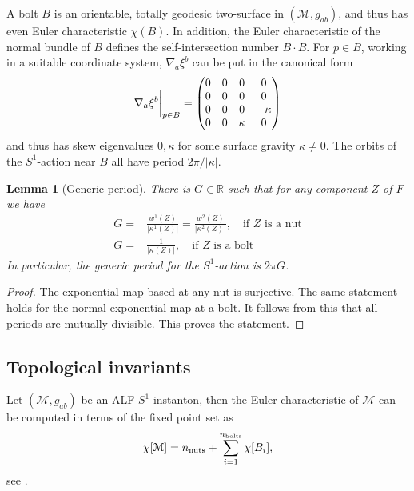 \documentclass[a4paper,10pt,reqno]{amsart}
\newcommand{\Reals}{\mathbb{R}}
\newcommand{\bolt}{B}
\newcommand{\cM}{\mathcal{M}}
\theoremstyle{plain}
\newtheorem{lemma}[thm]{Lemma}
\newcommand{\nnuts}{n_{\text{\rm nuts}}}
\newcommand{\nbolts}{n_{\text{\rm bolts}}}
\numberwithin{equation}{section}
\newcommand{\Fixed}{F}
\begin{document}
A bolt $\bolt$ is an orientable, totally geodesic 
two-surface in $(\cM, g_{ab})$,  and thus has even Euler characteristic $\chi(\bolt)$. In addition, the Euler characteristic of the normal bundle of $\bolt$ defines the self-intersection number $\bolt\!\cdot\! \bolt$.  For $p \in \bolt$, working in a suitable coordinate system, $\nabla_a \xi^b$ can be put in the canonical  form 
\begin{align} \label{eq:nablaxi(bolt)}
\nabla_a \xi^b \bigg{|}_{p \in \bolt} = \begin{pmatrix}0&0&0&0\\0 &0&0&0\\0&0&0&-\kappa\\0&0&\kappa&0\end{pmatrix}
\end{align} 
and thus has skew eigenvalues $0, \kappa$ for some surface gravity $\kappa \ne 0$. The orbits of the $S^1$-action near $\bolt$ all have period $2\pi/|\kappa|$. 


\begin{lemma}[Generic period] \label{lem:generic} 
%
%
There is $G \in \Reals$ such that for any component $Z$ of $\Fixed$ we have    
\begin{align} 
G ={}& \frac{w^1(Z)}{|\kappa^1(Z)|} = \frac{w^2(Z)}{|\kappa^2(Z)|}, \quad \text{if $Z$ is a nut} \\
G ={}& \frac{1}{|\kappa(Z)|}, \quad \text{if $Z$ is a bolt}
\end{align} 
%
In particular, the generic period for the $S^1$-action is $2\pi G$. 
\end{lemma} 
\begin{proof} 
The exponential map based at any nut is surjective. The same statement holds for the normal exponential map at a bolt. It follows from this that all periods are mutually divisible. This proves the statement. 
\end{proof} 
  
 
\subsection{Topological invariants} 
\label{sec:topin}

Let $(\cM, g_{ab})$ be an ALF $S^1$ instanton, then the Euler characteristic of $\cM$ can be computed in terms of the fixed point set as
\begin{align} \label{eq:chinutbolt}
\chi[\cM] = \nnuts + \sum_{i=1}^{\nbolts} \chi[\bolt_i], 
\end{align} 
see \cite{HirzebruchBergerJung}.
\end{document}
